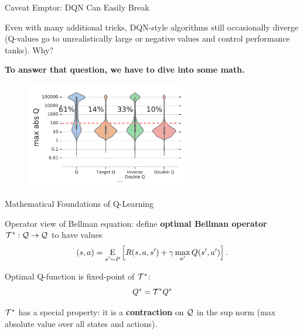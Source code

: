 \documentclass[9pt]{beamer}
\newcommand{\underE}[2]{\underset{\begin{subarray}{c}#1 \end{subarray}}{\E}\left[ #2 \right]}
\begin{document}
\begin{frame}{Caveat Emptor: DQN Can Easily Break}

Even with many additional tricks, DQN-style algorithms still occasionally diverge (Q-values go to unrealistically large or negative values and control performance tanks). Why?

\vspace{2em}
\textbf{To answer that question, we have to dive into some math.}

\begin{figure}
\centering
\includegraphics[width=7cm]{q_divergence}
\end{figure}


\end{frame}

\begin{frame}{Mathematical Foundations of Q-Learning}

Operator view of Bellman equation: define \textbf{optimal Bellman operator} ${\mathcal T}^* : {\mathcal Q} \to {\mathcal Q}$ to have values
%
\begin{equation*}
[\calT^*Q](s,a) = \underE{s' \sim P}{R(s,a,s') + \gamma \max_{a'} Q(s',a')}.
\end{equation*}

\vspace{2em}
Optimal Q-function is fixed-point of ${\mathcal T}^*$:
%
\begin{equation*}
Q^* = {\mathcal T}^* Q^*
\end{equation*}

${\mathcal T}^*$ has a special property: it is a \textbf{contraction} on ${\mathcal Q}$ in the sup norm (max absolute value over all states and actions).

\end{frame}
\end{document}
